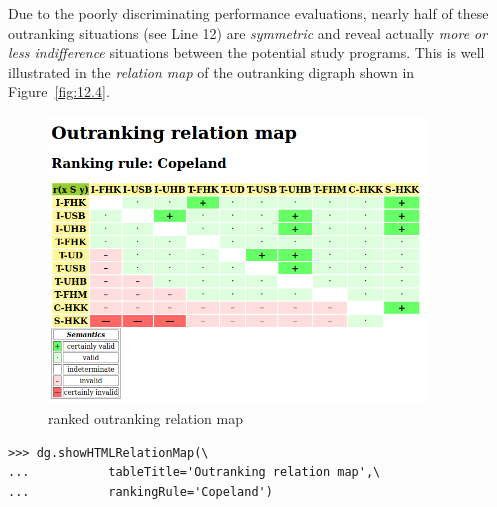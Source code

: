 Due to the poorly discriminating performance evaluations, nearly half of these outranking situations (see Line 12) are \emph{symmetric} and reveal actually \emph{more or less indifference} situations between the potential study programs. This is well illustrated in the \emph{relation map} of the outranking digraph shown in Figure~\vref{fig:12.4}.
\begin{figure}[ht]
\includegraphics[width=10cm]{Figures/12-4-aliceRelationmap.png}
\caption{\Copeland ranked outranking relation map}
\label{fig:12.4}       %
\end{figure}
\begin{lstlisting}
>>> dg.showHTMLRelationMap(\
...           tableTitle='Outranking relation map',\
...           rankingRule='Copeland')
\end{lstlisting}

